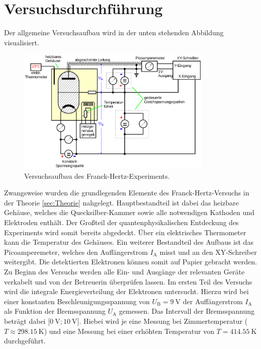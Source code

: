%

%

\section{Versuchsdurchführung}

Der allgemeine Versuchsaufbau wird in der unten stehenden Abbildung visualisiert.

\begin{figure}
    \centering
    \includegraphics[height=6cm]{content/Aufbau.png}
    \caption{Versuchsaufbau des Franck-Hertz-Experiments\cite{Versuchsanleitung_v601}.}
    \label{fig:Aufbau}
\end{figure}

\noindent Zwangsweise wurden die grundlegenden Elemente des Franck-Hertz-Versuchs in der Theorie \ref{sec:Theorie} nahgelegt. Hauptbestandteil ist dabei 
das heizbare Gehäuse, welches die Quecksilber-Kammer sowie alle notwendigen Kathoden und Elektroden enthält. Der Großteil der quantenphysikalischen Entdeckung 
des Experiments wird somit bereits abgedeckt. Über ein elektrisches Thermometer kann die Temperatur des Gehäuses. Ein weiterer Bestandteil des Aufbaus ist 
das Picoamperemeter, welches den Auffängerstrom $I_\text{A}$ misst und an den XY-Schreiber weitergibt. Die detektierten Elektronen können somit auf Papier 
gebracht werden.\\

\noindent Zu Beginn des Versuchs werden alle Ein- und Ausgänge der relevanten Geräte verkabelt und von der Betreuerin überprüfen lassen. Im ersten Teil des Versuchs wird 
die integrale Energieverteilung der Elektronen untersucht. Hierzu wird bei einer konstanten Beschleunigungsspannung von $U_\text{B} = \qty{9}{\volt}$ der 
Auffängerstrom $I_\text{A}$ als Funktion der Bremsspannung $U_\text{A}$ gemessen. Das Intervall der Bremsspannung beträgt dabei [$\qty{0}{\volt};\qty{10}{\volt}$]. 
Hiebei wird je eine Messung bei Zimmertemperatur ($T \approx \qty{298.15}{\kelvin}$) und eine Messung bei einer erhöhten Temperatur von $T = \qty{414.55}{\kelvin}$
durchgeführt.\\

